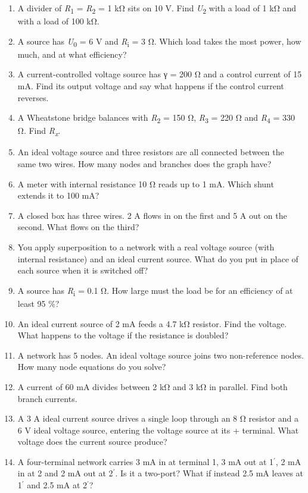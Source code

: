 \documentclass[11pt]{article}
\begin{document}
\begin{keepsection}
\begin{enumerate}
\item A divider of \textit{R}\textsubscript{1} = \textit{R}\textsubscript{2} = 1 kΩ sits on 10 V. Find \textit{U}\textsubscript{2} with a load of 1 kΩ and with a load of 100 kΩ.
\item A source has \textit{U}\textsubscript{0} = 6 V and \textit{R}\textsubscript{i} = 3 Ω. Which load takes the most power, how much, and at what efficiency?
\item A current-controlled voltage source has γ = 200 Ω and a control current of 15 mA. Find its output voltage and say what happens if the control current reverses.
\item A Wheatstone bridge balances with \textit{R}\textsubscript{2} = 150 Ω, \textit{R}\textsubscript{3} = 220 Ω and \textit{R}\textsubscript{4} = 330 Ω. Find \textit{R}\textsubscript{\textit{x}}.
\item An ideal voltage source and three resistors are all connected between the same two wires. How many nodes and branches does the graph have?
\item A meter with internal resistance 10 Ω reads up to 1 mA. Which shunt extends it to 100 mA?
\item A closed box has three wires. 2 A flows in on the first and 5 A out on the second. What flows on the third?
\item You apply superposition to a network with a real voltage source (with internal resistance) and an ideal current source. What do you put in place of each source when it is switched off?
\item A source has \textit{R}\textsubscript{i} = 0.1 Ω. How large must the load be for an efficiency of at least 95 \%?
\item An ideal current source of 2 mA feeds a 4.7 kΩ resistor. Find the voltage. What happens to the voltage if the resistance is doubled?
\item A network has 5 nodes. An ideal voltage source joins two non-reference nodes. How many node equations do you solve?
\item A current of 60 mA divides between 2 kΩ and 3 kΩ in parallel. Find both branch currents.
\item A 3 A ideal current source drives a single loop through an 8 Ω resistor and a 6 V ideal voltage source, entering the voltage source at its + terminal. What voltage does the current source produce?
\item A four-terminal network carries 3 mA in at terminal 1, 3 mA out at 1\ensuremath{{}^{\prime}}, 2 mA in at 2 and 2 mA out at 2\ensuremath{{}^{\prime}}. Is it a two-port? What if instead 2.5 mA leaves at 1\ensuremath{{}^{\prime}} and 2.5 mA at 2\ensuremath{{}^{\prime}}?
\end{enumerate}

\end{keepsection}
\end{document}
